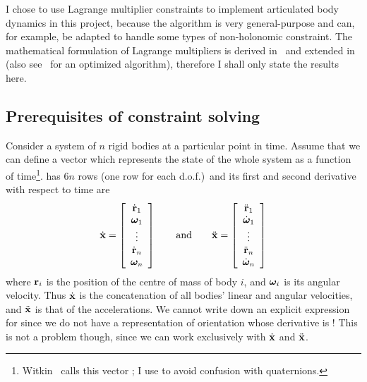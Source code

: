 I chose to use Lagrange multiplier constraints to implement articulated body dynamics in this
project, because the algorithm is very general-purpose and can, for example, be adapted to handle
some types of non-holonomic constraint.
The mathematical formulation of Lagrange multipliers is derived in~\cite{BaraffWitkin:97} and
extended in~\cite{Saunders:PhD} (also see~\cite{Baraff:96} for an optimized algorithm),
therefore I shall only state the results here.

\subsection{Prerequisites of constraint solving}

Consider a system of $n$ rigid bodies at a particular point in time. Assume that we can define
a vector  which represents the state of the whole system as a function of
time\footnote{Witkin~\cite{BaraffWitkin:97} calls this vector ; I use  to avoid
confusion with quaternions.}.  has $6n$ rows (one row for each d.o.f.)\ and its first and
second derivative with respect to time are
\begin{equation}
\label{lagrangeStateVector}
\dot{\ve{x}} = \left[ \begin{array}{c}
    \dot{\ve{r}}_1\\ \ve{\omega}_1\\ \vdots\\ \dot{\ve{r}}_n\\ \ve{\omega}_n \end{array}\right]
\quad\quad\mathrm{and}\quad\quad
\ddot{\ve{x}} = \left[ \begin{array}{c}
    \ddot{\ve{r}}_1\\ \dot{\ve{\omega}}_1\\ \vdots\\ \ddot{\ve{r}}_n\\ \dot{\ve{\omega}}_n
    \end{array}\right]
\end{equation}
where $\ve{r}_i$ is the position of the centre of mass of body $i$, and $\ve{\omega}_i$ is its
angular velocity. Thus $\dot{\ve{x}}$ is the concatenation of all bodies' linear and angular
velocities, and $\ddot{\ve{x}}$ is that of the accelerations. We cannot write down an explicit
expression for  since we do not have a representation of orientation whose derivative is
\ve{\omega}! This is not a problem though, since we can work exclusively with $\dot{\ve{x}}$ and
$\ddot{\ve{x}}$.

